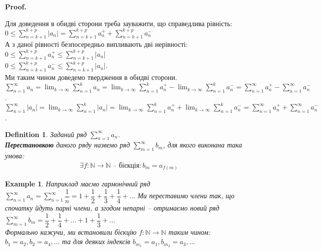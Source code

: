\documentclass[a4paper, 10pt]{article}
\makeatletter
\def\qed{$\blacksquare$}
\theoremstyle{theoremdd}
\theoremstyle{theoremdd}
\theoremstyle{theoremdd}
\newtheorem{definition}[theorem]{Definition}
\theoremstyle{theoremdd}
\theoremstyle{theoremdd}
\newtheorem{example}[theorem]{Example}
\theoremstyle{theoremdd}
\theoremstyle{theoremdd}
\theoremstyle{theoremdd}
\theoremstyle{theoremdd}
\renewenvironment{proof}[1][Proof.\\]{\par
\pushQED{\hfill \qed}%
\normalfont \topsep6\p@\@plus6\p@\relax
\trivlist
\item\relax
{\bfseries
#1\@addpunct{.}}\hspace\labelsep\ignorespaces
}{%
\popQED\endtrivlist\@endpefalse
}
\makeatother
\begin{document}
\begin{proof}
Для доведення в обидві сторони треба зауважити, що справедлива рівність:\\
$0 \leq \displaystyle\sum_{n=k+1}^{k+p} |a_n| = \sum_{n=k+1}^{k+p} a_n^+ + \sum_{n=k+1}^{k+p} a_n^-$\\
А з даної рівності безпосередньо випливають дві нерівності:\\
$0 \leq \displaystyle\sum_{n=k+1}^{k+p} a_n^+ \leq \sum_{n=k+1}^{k+p} |a_n|$\\
$0 \leq \displaystyle\sum_{n=k+1}^{k+p} a_n^- \leq \sum_{n=k+1}^{k+p} |a_n|$.\\
Ми таким чином доведемо твердження в обидві сторони.
\bigskip \\
$\displaystyle\sum_{n=1}^\infty a_n = \lim_{k \to \infty} \sum_{n=1}^k a_n = \lim_{k \to \infty} \sum_{n=1}^k a_n^+ - \lim_{k \to \infty} \sum_{n=1}^k a_n^- = \sum_{n=1}^\infty a_n^+ - \sum_{n=1}^\infty a_n^-$.\\
$\displaystyle\sum_{n=1}^\infty |a_n| = \lim_{k \to \infty} \sum_{n=1}^k |a_n| = \lim_{k \to \infty} \sum_{n=1}^k a_n^+ + \lim_{k \to \infty} \sum_{n=1}^k a_n^- = \sum_{n=1}^\infty a_n^+ + \sum_{n=1}^\infty a_n^-$.
\end{proof}

\begin{definition}
Заданий ряд $\displaystyle\sum_{n=1}^\infty a_n$.\\
\textbf{Перестановкою} даного ряду назвемо ряд $\displaystyle\sum_{m=1}^\infty b_m$, для якого виконана така умова:
\begin{align*}
\exists f \colon \mathbb{N} \to \mathbb{N} \text{ -- бієкція}: b_m = a_{f(m)}
\end{align*}
\end{definition}

\begin{example}
Наприклад маємо гармонічний ряд $\displaystyle \sum_{n=1}^\infty a_n = \sum_{n=1}^\infty \dfrac{1}{n} = 1 + \dfrac{1}{2} + \dfrac{1}{3} + \dfrac{1}{4} + \dots$ Ми переставимо члени так, що спочатку йдуть парні члени, а згодом непарні -- отримаємо новий ряд $\displaystyle\sum_{m=1}^\infty b_m = \dfrac{1}{2} + \dfrac{1}{4} + \dots + 1 + \dfrac{1}{3} + \dots$\\
Формально кажучи, ми встановили бієкцію $f \colon \mathbb{N} \to \mathbb{N}$ таким чином: $b_{1} = a_{2}, b_{2} = a_4,\dots$ та для деяких індексів $b_{m_1} = a_1, b_{m_2} = a_3, \dots$
\end{example}
\end{document}

